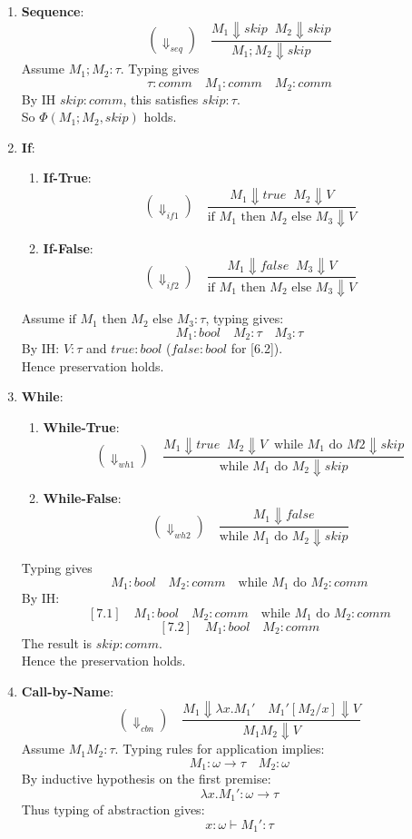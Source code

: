 \begin{solution}
\begin{enumerate}
\item \textbf{Sequence}:
\[(\Downarrow_{seq}) \quad \frac{M_1 \Downarrow skip \; \; M_2 \Downarrow skip}{M_1 ; M_2 \Downarrow skip} \]
Assume $M_1;M_2 : \tau$. Typing gives 
\[\tau:comm \quad M_1:comm \quad M_2:comm\]
By IH $skip:comm$, this satisfies $skip:\tau$. 
\\
So $\Phi(M_1;M_2, skip)$ holds.
\item \textbf{If}:
\begin{enumerate}
    \item \textbf{If-True}:
    \[(\Downarrow_{if1}) \quad \frac{M_1 \Downarrow true \; \; M_2 \Downarrow V}{\text{if } M_1 \text{ then }M_2 \text{ else }M_3 \Downarrow V} \]
    \item \textbf{If-False}:
      \[(\Downarrow_{if2}) \quad \frac{M_1 \Downarrow false \; \; M_3 \Downarrow V}{\text{if } M_1 \text{ then }M_2 \text{ else }M_3 \Downarrow V} \]
\end{enumerate}
   Assume $\text{if } M_1 \text{ then }M_2 \text{ else }M_3: \tau$, typing gives:
    \[M_1: bool\quad M_2:\tau \quad M_3:\tau\]
    By IH: $V:\tau$ and $true:bool$ ($false:bool$ for [6.2]).
    \\
    Hence preservation holds.
\item \textbf{While}:
\begin{enumerate}
    \item \textbf{While-True}:
    \[(\Downarrow_{wh1}) \quad \frac{M_1 \Downarrow true \; \; M_2 \Downarrow V \; \;  \text{while }M_1 \text{ do }M2\Downarrow skip}{\text{while } M_1 \text{ do }M_2  \Downarrow skip} \]
    \item \textbf{While-False}:
      \[(\Downarrow_{wh2}) \quad \frac{M_1 \Downarrow false }{\text{while } M_1 \text{ do }M_2  \Downarrow skip} \]
\end{enumerate}
Typing gives \[M_1:bool \quad M_2:comm \quad \text{while } M_1 \text{ do }M_2 :comm\]
By IH: \[ [7.1]\quad M_1:bool \quad M_2:comm \quad \text{while } M_1 \text{ do }M_2 :comm\]
\[ [7.2]\quad M_1:bool \quad M_2:comm \]
The result is $skip:comm$.
\\Hence the preservation holds.
\item \textbf{Call-by-Name}:
\[(\Downarrow_{cbn})\quad \frac{M_1 \Downarrow \lambda x.M_1'\quad M_1'[M_2/x]\Downarrow V}{M_1M_2 \Downarrow V} \]
Assume $M_1M_2: \tau$.
Typing rules for application implies: \[M_1:\omega \to \tau \quad M_2:\omega \]
By inductive hypothesis on the first premise:\[\lambda x.M_1':\omega \to \tau\]
Thus typing of abstraction gives:
\[x:\omega \vdash M_1':\tau\]

\end{enumerate}
\end{solution}
